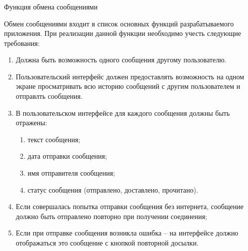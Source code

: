 \subsubsection{} Функция обмена сообщениями
\label{sec:analysis:research:funcreq:messages}

Обмен сообщениями входит в список основных функций разрабатываемого приложения. При реализации данной функции необходимо учесть следующие требования:

\begin{enumerate}
	\item Должна быть возможность одного сообщения другому пользователю.
	\item Пользовательский интерфейс должен предоставлять возможность на одном экране просматривать всю историю сообщений с другим пользователем и отправлть сообщения.
	\item В пользовательском интерфейсе для каждого сообщения должны быть отражены:
	\begin{enumerate}
		\item текст сообщения;
		\item дата отправки сообщения;
		\item имя отправителя сообщения;
		\item статус сообщения (отправлено, доставлено, прочитано).
	\end{enumerate}
	\item Если совершалась попытка отправки сообщения без интернета, сообщение должно быть отправлено повторно при получении соединения;
	\item Если при отправке сообщения возникла ошибка -- на интерфейсе должно отображаться это сообщение с кнопкой повторной досылки.
\end{enumerate}